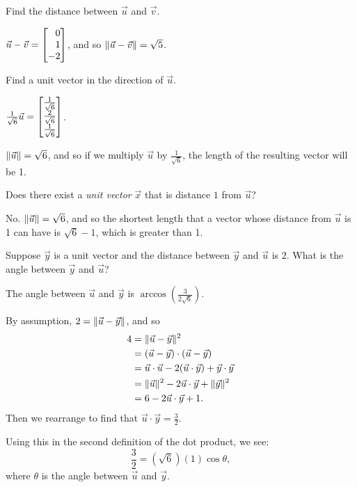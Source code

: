 \documentclass{problemset}
\begin{document}
	\begin{parts}
		\item Find the distance between $\vec u$ and $\vec v$.
			\begin{solution}
				$\vec u - \vec v = \mat{0\\1\\-2}$, and so $\lVert\vec u-\vec v\rVert = \sqrt{5}$.
			\end{solution}
		\item Find a unit vector in the direction of $\vec u$.
			\begin{solution}
				$\frac{1}{\sqrt{6}} \vec u = \mat{\frac{1}{\sqrt{6}}\\\frac{2}{\sqrt{6}}\\\frac{1}{\sqrt{6}}}$.

				$\lVert\vec u\rVert = \sqrt{6}$, and so if we multiply $\vec u$ by $\frac{1}{\sqrt{6}}$,
				the length of the resulting vector will be 1.
			\end{solution}
		\item Does there exist a \emph{unit vector} $\vec x$ that is distance
			$1$ from $\vec u$?
			\begin{solution}
				No. $\lVert\vec u\rVert = \sqrt{6}$, and so the shortest length that a
				vector whose distance from $\vec u$ is 1 can have is $\sqrt{6} - 1$,
				which is greater than 1.
			\end{solution}
		\item Suppose $\vec y$ is a unit vector and the distance between $\vec y$
			and	$\vec u$ is $2$. What is the angle between $\vec y$ and $\vec u$?
			\begin{solution}
				The angle between $\vec u$ and $\vec y$ is $\arccos\left(\frac{3}{2\sqrt{6}}\right)$.

				By assumption, $2=\lVert\vec u-\vec y\rVert$, and so
				\begin{align*}
					4 &= \lVert\vec u-\vec y\rVert^2\\
					&= (\vec u-\vec y)\cdot(\vec u-\vec y)\\
					&= \vec u\cdot\vec u - 2(\vec u\cdot\vec y) + \vec y\cdot\vec y\\
					&=\lVert\vec u\rVert^2 - 2\vec u\cdot\vec y + \lVert\vec y\rVert^2\\
					&=6 - 2\vec u\cdot\vec y + 1.
				\end{align*}
				Then we rearrange to find that $\vec u\cdot \vec y = \frac{3}{2}$.

				Using this in the second definition of the dot product, we see:
				\[
					\frac{3}{2} = \left(\sqrt{6}\right)(1) \cos \theta,
				\]
				where $\theta$ is the angle between $\vec u$ and $\vec y$.
			\end{solution}
	\end{parts}
\end{document}
